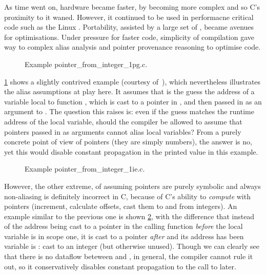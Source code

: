 As time went on, hardware became faster, by becoming more complex and so C's
proximity to it waned. However, it continued to be used in performacne critical
code such as the Linux . Portability, assisted by a large set of
, became avenues for optimisations. Under pressure for faster code,
simplicity of compilation gave way to complex alias analysis and pointer
provenance reasoning to optimise code.

\begin{figure}[h]
\centering
{}
\caption{Example pointer\_from\_integer\_1pg.c.}\label{fig:ptr-from-int-ub}
\end{figure}%

\cref{fig:ptr-from-int-ub} shows a slightly contrived example (courtesy
of~), which nevertheless illustrates the
alias assumptions at play here. It assumes that  is
the guess the address of a variable local to function , which is
cast to a pointer in , and then passed in as an argument to
. The question this raises is: even if the guess matches the runtime
address of the local variable, should the compiler be allowed to assume that
pointers passed in as arguments cannot alias local variables? From a purely
concrete point of view of pointers (they are simply numbers), the answer is no,
yet this would disable constant propagation in the printed value in this
example.

\begin{figure}[h]
\centering
{}
\caption{Example pointer\_from\_integer\_1ie.c.}\label{fig:ptr-from-int}
\end{figure}%

However, the other extreme, of assuming pointers are purely symbolic and always
non-aliasing is definitely incorrect in C, because of C's ability to
\emph{compute} with pointers (increment, calculate offsets, cast them to and
from integers). An example similar to the previous one is shown
\cref{fig:ptr-from-int}, with the difference that instead of the address being
cast to a pointer in the calling function \emph{before} the local variable is
in scope one, it is cast to a pointer \emph{after} and its address has been
variable is : cast to an integer (but otherwise unused). Though
we can clearly see that there is no dataflow beteween  and
, in general, the compiler cannot rule it out, so it conservatively
disables constant propagation to the call to  later.

